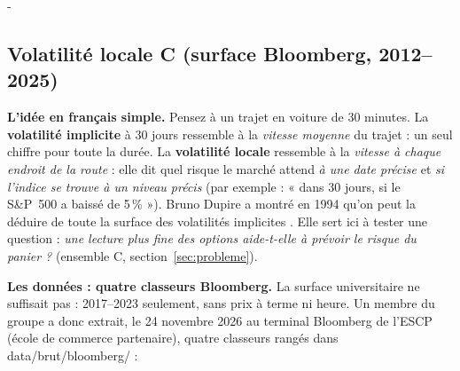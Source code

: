 \documentclass[10pt,a4paper]{article}
\makeatletter
\newcommand{\besoin}[1]{\par\penalty-100\begingroup\setlength{\dimen@}{#1}%
  \dimen@ii\pagegoal\advance\dimen@ii-\pagetotal
  \ifdim\dimen@>\dimen@ii\ifdim\dimen@ii>\z@\vfil\fi\break\fi\endgroup}
\let\soussectionorigine\subsection
\renewcommand{\subsection}{\besoin{5\baselineskip}\soussectionorigine}
\newcommand{\coupure}{\textunderscore\allowbreak}
\newcommand{\fic}[1]{{\small\ttfamily\let\_\coupure #1}}
\makeatother
\begin{document}
\subsection{Volatilité locale C (surface Bloomberg, 2012–2025)}\label{sec:locale}
\textbf{L'idée en français simple.} Pensez à un trajet en voiture de 30 minutes. La \textbf{volatilité implicite} à 30 jours ressemble à la \emph{vitesse moyenne} du trajet : un seul chiffre pour toute la durée. La \textbf{volatilité locale} ressemble à la \emph{vitesse à chaque endroit de la route} : elle dit quel risque le marché attend \emph{à une date précise} et \emph{si l'indice se trouve à un niveau précis} (par exemple : « dans 30 jours, si le S\&P~500 a baissé de 5\,\% »). Bruno Dupire a montré en 1994 qu'on peut la déduire de toute la surface des volatilités implicites \cite{dupire}. Elle sert ici à tester une question : \emph{une lecture plus fine des options aide-t-elle à prévoir le risque du panier ?} (ensemble C, section~\ref{sec:probleme}).

\textbf{Les données : quatre classeurs Bloomberg.} La surface universitaire ne suffisait pas : 2017–2023 seulement, sans prix à terme ni heure. Un membre du groupe a donc extrait, le 24 novembre 2026 au terminal Bloomberg de l'ESCP (école de commerce partenaire), quatre classeurs rangés dans \fic{data/brut/bloomberg/} :
\end{document}
